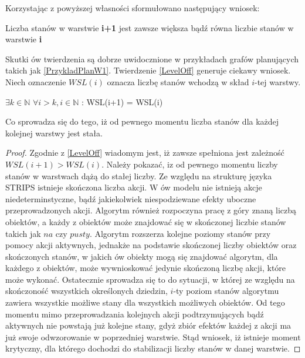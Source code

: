     Korzystając z powyższej własności sformułowano następujący wniosek:
    \begin{theorem}
        \label{LevelOff}
        Liczba stanów w warstwie \textbf{i+1} jest zawsze większa bądź równa liczbie stanów w warstwie \textbf{i}
    \end{theorem}
    Skutki ów twierdzenia są dobrze uwidocznione w przykładach grafów planujących takich jak \ref{PrzykladPlanW1}.
    Twierdzenie \ref{LevelOff} generuje ciekawy wniosek. Niech oznaczenie $WSL(i)$ oznacza liczbę stanów wchodzą w skład $i$-tej warstwy.

    \begin{lemma}
        $\exists k\in\mathbb{N}$  $\forall i>k, i\in\mathbb{N}$ : WSL(i+1) = WSL(i)
    \end{lemma}

    Co sprowadza się do tego, iż od pewnego momentu liczba stanów dla każdej kolejnej warstwy jest stała.

    \begin{proof}
        Zgodnie z \ref{LevelOff} wiadomym jest, iż zawsze spełniona jest zależność $WSL(i+1) > WSL(i)$. Należy pokazać, iz od pewnego momentu 
        liczby stanów w warstwach dążą do stałej liczby. Ze względu na strukturę języka STRIPS istnieje skończona liczba akcji. W ów modelu nie istnieją
        akcje niedeterminstyczne, bądź jakiekolwiek niespodziewane efekty uboczne przeprowadzonych akcji. 
        Algorytm również rozpoczyna pracę z góry znaną liczbą obiektów, a każdy z obiektów może znajdować się w skończonej liczbie stanów takich 
        jak $na$ czy $pusty$. Algorytm rozszerza kolejne poziomy stanów przy pomocy akcji aktywnych, jednakże na podstawie skończonej 
        liczby obiektów oraz skończonych stanów, w jakich ów obiekty mogą się znajdować algorytm, dla każdego z obiektów, może wywnioskować jedynie skończoną 
        liczbę akcji, które może wykonać. Ostatecznie sprowadza się to do sytuacji, w której ze względu na skończoność wszystkich określonych dziedzin,
        $i$-ty poziom stanów algorytmu zawiera wszystkie możliwe stany dla wszystkich możliwych obiektów.
        Od tego momentu mimo przeprowadzania kolejnych akcji podtrzymujących bądź 
        aktywnych nie powstają już kolejne stany, gdyż zbiór efektów każdej z akcji ma już swoje odwzorowanie w poprzedniej warstwie. 
        Stąd wniosek, iż istnieje 
        moment krytyczny, dla którego dochodzi do stabilizacji liczby stanów w danej warstwie.
    \end{proof}

